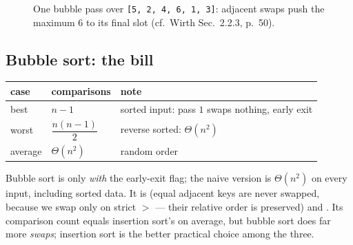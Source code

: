 \documentclass[11pt]{article}
\begin{document}
\begin{figure}[h]
  \centering
  \caption{One bubble pass over \texttt{[5, 2, 4, 6, 1, 3]}: adjacent swaps push the maximum $6$ to its final slot (cf.\ Wirth Sec.~2.2.3, p.~50).}
  \label{fig:bubble}
\end{figure}

\subsection{Bubble sort: the bill}

\begin{center}
{\footnotesize
\begin{tabular}{lll}
  \toprule
  \textbf{case} & \textbf{comparisons} & \textbf{note} \\
  \midrule
  best & $n-1$ & sorted input: pass $1$ swaps nothing, early exit \\
  worst & $\dfrac{n(n-1)}{2}$ & reverse sorted: $\Theta(n^2)$ \\
  average & $\Theta(n^2)$ & random order \\
  \bottomrule
\end{tabular}}
\end{center}

Bubble sort is  only \emph{with} the early-exit flag; the naive version is $\Theta(n^2)$ on every input, including sorted data. It is  (equal adjacent keys are never swapped, because we swap only on strict $>$ --- their relative order is preserved) and . Its comparison count equals insertion sort's on average, but bubble sort does far more \emph{swaps}; insertion sort is the better practical choice among the three.
\end{document}
